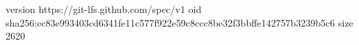 version https://git-lfs.github.com/spec/v1
oid sha256:ec83e993403cd6341fe11c577f922e59c8ccc8be32f3bbffe142757b3239b5c6
size 2620
